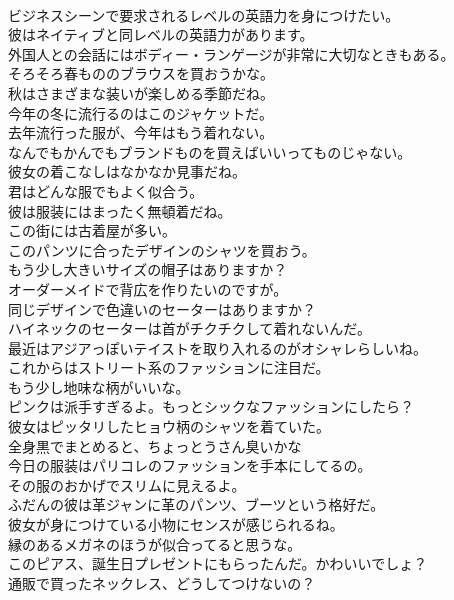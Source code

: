 \documentclass[8pt]{extreport}
\begin{document}
\begin{CJK}{UTF8}{min}
\\	ビジネスシーンで要求されるレベルの英語力を身につけたい。	
\\	彼はネイティブと同レベルの英語力があります。	
\\	外国人との会話にはボディー・ランゲージが非常に大切なときもある。	
\\	そろそろ春もののブラウスを買おうかな。	
\\	秋はさまざまな装いが楽しめる季節だね。	
\\	今年の冬に流行るのはこのジャケットだ。	
\\	去年流行った服が、今年はもう着れない。	
\\	なんでもかんでもブランドものを買えばいいってものじゃない。	
\\	彼女の着こなしはなかなか見事だね。	
\\	君はどんな服でもよく似合う。	
\\	彼は服装にはまったく無頓着だね。	
\\	この街には古着屋が多い。	
\\	このパンツに合ったデザインのシャツを買おう。	
\\	もう少し大きいサイズの帽子はありますか？	
\\	オーダーメイドで背広を作りたいのですが。	
\\	同じデザインで色違いのセーターはありますか？	
\\	ハイネックのセーターは首がチクチクして着れないんだ。	
\\	最近はアジアっぽいテイストを取り入れるのがオシャレらしいね。	
\\	これからはストリート系のファッションに注目だ。	
\\	もう少し地味な柄がいいな。	
\\	ピンクは派手すぎるよ。もっとシックなファッションにしたら？	
\\	彼女はピッタリしたヒョウ柄のシャツを着ていた。	
\\	全身黒でまとめると、ちょっとうさん臭いかな	
\\	今日の服装はパリコレのファッションを手本にしてるの。	
\\	その服のおかげでスリムに見えるよ。	
\\	ふだんの彼は革ジャンに革のパンツ、ブーツという格好だ。	
\\	彼女が身につけている小物にセンスが感じられるね。	
\\	縁のあるメガネのほうが似合ってると思うな。	
\\	このピアス、誕生日プレゼントにもらったんだ。かわいいでしょ？	
\\	通販で買ったネックレス、どうしてつけないの？	

\end{CJK}
\end{document}
